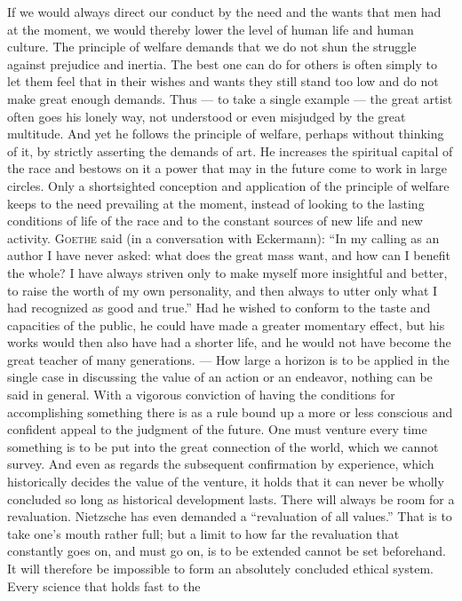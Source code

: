 \documentclass[12pt,a4paper,openany]{book}
\newcommand{\opage}[1]{\marginnote{\footnotesize\textit{[#1]}}}
\begin{document}
If we would always direct our conduct by the need and the wants that men had at the moment, we would
thereby lower the level of human life and human culture. The principle of welfare demands that we do not
shun the struggle against prejudice and inertia. The best one can do for others is often simply to let them
feel that in their wishes and wants they still stand too low and do not make great enough demands. Thus ---
to take a single example --- the great artist often goes his lonely way, not understood or even misjudged by
the great multitude. And yet he follows the principle of welfare, perhaps without thinking of it, by
strictly asserting the demands of art. He increases the spiritual capital of the race and bestows on it a
power that may in the future come to work in large circles. Only a shortsighted conception and application
of the principle of welfare keeps to the need prevailing at the moment, instead of looking to the lasting
conditions of life of the race and to the constant sources of new life and new activity. \textsc{Goethe}
said (in a conversation with Eckermann): ``In my calling as an author I have never asked: what does the
great mass want, and how can I benefit the whole? I have always striven only to make myself more insightful
and better, to raise the worth of my own personality, and then always to utter only what I had recognized
as good and true.'' Had he wished to conform to the taste and capacities of the public, he could have made a
greater momentary effect, but his works would then also have had a shorter life, and he would not have
become the great teacher of many generations. --- How large a horizon is to be applied in the single case in
discussing the value of an action or an endeavor, nothing can be said in general. With a vigorous conviction
of having the conditions for accomplishing something there is as a rule bound up a more or less conscious
and confident appeal to the judgment
\opage{152}of the future. One must venture every time something is to be put into the great connection of the
world, which we cannot survey. And even as regards the subsequent confirmation by experience, which
historically decides the value of the venture, it holds that it can never be wholly concluded so long as
historical development lasts. There will always be room for a revaluation. Nietzsche has even demanded a
``revaluation of all values.'' That is to take one's mouth rather full; but a limit to how far the
revaluation that constantly goes on, and must go on, is to be extended cannot be set beforehand. It will
therefore be impossible to form an absolutely concluded ethical system. Every science that holds fast to the
\end{document}
